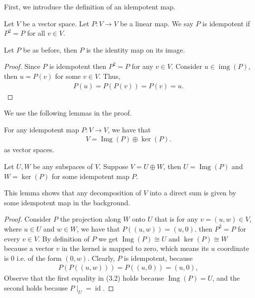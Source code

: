 First, we introduce the definition of an idempotent map.
\begin{definition}
    Let $V$ be a vector space. Let $P: V \to V$ be a linear map. We say $P$ is idempotent if $P^2 = P$ for all $v \in V$.
\end{definition}

\begin{corollary}
       Let $P$ be as before, then $P$ is the identity map on its image.
\end{corollary}
\begin{proof}
    Since $P$ is idempotent then $P^2 = P$ for any $v \in V$. Consider $u \in \operatorname{img}(P)$, then $u = P(v)$ for some $v \in V$. Thus, 
    \begin{align*}
        P(u)  = P(P(v)) =  P(v)  = u.
    \end{align*}
\end{proof}
We use the following lemmas in the proof.

\begin{lemma}
    For any idempotent map $P:V \to V$, we have that 
    \begin{align*}
        V = \operatorname{Img}(P) \oplus \operatorname{ker}(P).
    \end{align*}
    as vector spaces. 
\end{lemma}
\begin{lemma}
   Let $U,W$ be any subspaces of $V$. Suppose $V = U \oplus W$, then $U = \operatorname{Img}(P) $ and $W = \operatorname{ker}(P)$ for some idempotent map $P$.
\end{lemma}
This lemma shows that any decomposition of $V$ into a direct sum is given by some idempotent map in the background.

\begin{proof}
    Consider $P$ the projection along $W$ onto $U$ that is for any $v = (u ,w) \in V$, where $u \in U$ and $w \in W$, we have that 
    $P((u,w)) = (u,0)$. 
    then $P^2 = P$ for every $v \in V$. By definition of $P$ we get $\operatorname{Img}(P) \cong U$ and $\ker(P) \cong W $ because a vector $v$ in the kernel is mapped to zero, which means its $u$ coordinate is $0$ i.e. of the form $(0,w)$. Clearly, $P$ is idempotent, because
    \begin{align}
        P(P((u,w))) = P((u,0)) = (u,0),
    \end{align}
    Observe that the first equality in (3.2) holds because $\operatorname{Img}(P) = U$, and the second holds because $P\mid_U = \operatorname{id}$.

\end{proof}

